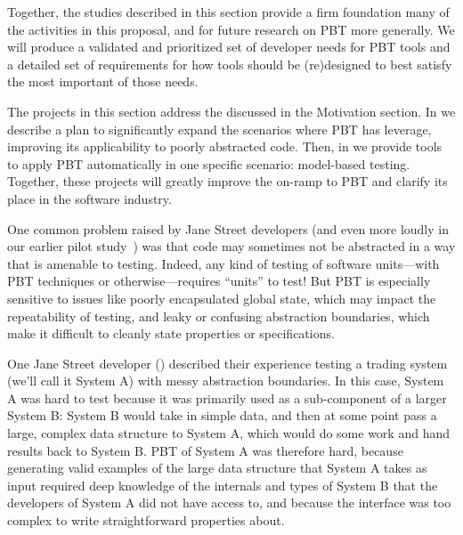 
\smallskip

Together, the studies described in this section provide a firm foundation many
of the activities in this proposal, and for future research on PBT more
generally. We will produce a validated and prioritized set of developer needs
for PBT tools and a detailed set of requirements for how tools should be
(re)designed to best satisfy the most important of those needs.

The projects in this section address the 
discussed in the Motivation section.  In  we describe
a plan to significantly expand the scenarios where PBT has leverage, improving
its applicability to poorly abstracted code. Then, in
 we provide tools to apply PBT automatically in one
specific scenario: model-based testing.  Together, these projects will greatly
improve the on-ramp to PBT and clarify its place in the software industry.



One common problem raised by Jane Street developers (and even more loudly
in our earlier pilot study~\cite{ref:goldstein2022some}) was
that code may sometimes not be abstracted
in a way that is amenable to testing. Indeed, any kind of
testing of software units---with PBT techniques or otherwise---requires
``units'' to test!  But PBT is
especially sensitive to issues like poorly encapsulated global state, which may
impact the repeatability of testing, and leaky or confusing
abstraction boundaries, which make it difficult to cleanly state
properties or specifications.

One Jane Street developer () described their experience testing
a trading system (we'll call it System A) with messy abstraction boundaries. In
this case, System A was hard to test because it was primarily used as a
sub-component of a larger System B: System B would take in simple data, and then
at some point pass a large, complex data structure to System A, which would do
some work and hand results back to System B. PBT of System A was therefore hard,
because generating valid examples of the large data structure that System A
takes as input required deep knowledge of the internals and types of System B
that the developers of System A did not have access to, and because the
interface was too complex to write straightforward properties about.

